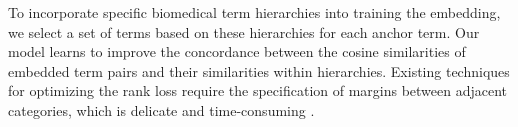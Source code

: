\documentclass[12pt,a4paper]{cibb}
\begin{document}
To incorporate specific biomedical term hierarchies into training the embedding, we select a set of terms based on these hierarchies for each anchor term. Our model learns to improve the concordance between the cosine similarities of embedded term pairs and their similarities within hierarchies. Existing techniques for optimizing the rank loss require the specification of margins between adjacent categories\cite{%
liu-etal-2022-brio}, which is delicate and time-consuming \cite{yuan2023rrhf, LeCun2006ATO}. 

\end{document}
